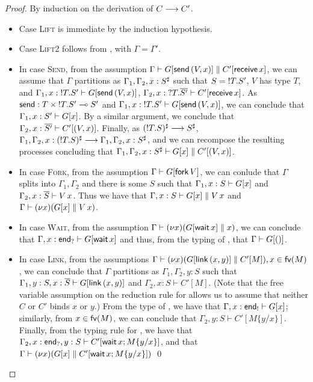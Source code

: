 \documentclass[orivec,envcountsame]{llncs}
\begin{document}
\begin{proof}
  By induction on the derivation of $C \longrightarrow C'$.
  \begin{itemize}
  \item Case \textsc{Lift} is immediate by the induction hypothesis.
  \item Case \textsc{Lift2} follows from , with $\Gamma = \Gamma'$.
  \item In case \textsc{Send}, from the assumption $\Gamma \vdash G[\mathsf{send}\,(V,x)] \parallel
    C'[\mathsf{receive} \, x]$, we can assume that $\Gamma$ partitions as
    $\Gamma_1,\Gamma_2,x:S^\sharp$ such that $S = {!T.S'}$, $V$ has type $T$, and
    $\Gamma_1,x:{!T.S'} \vdash G[\mathsf{send} \, (V,x)]$,
    $\Gamma_2,x:{?T.\overline{S'}} \vdash C'[\mathsf{receive} \, x]$.  As $\mathsf{send} : T
    \times {!T.S'} \multimap S'$ and $\Gamma_1,x:{!T.S'} \vdash G[\mathsf{send} \,
    (V,x)]$, we can conclude that $\Gamma_1,x:S' \vdash G[x]$.  By a similar argument, we conclude
    that $\Gamma_2,x:\overline{S'} \vdash C'[(V,x)]$. Finally, as $({!T.S})^\sharp \longrightarrow
    S^\sharp$, $\Gamma_1,\Gamma_2,x:({!T.S})^\sharp \longrightarrow
    \Gamma_1,\Gamma_2,x:S^\sharp$, and we can recompose the resulting processes concluding that
    $\Gamma_1,\Gamma_2,x:S^\sharp \vdash G[x] \parallel C'[(V,x)]$.
  \item In case \textsc{Fork}, from the assumption $\Gamma \vdash G[\mathsf{fork} \, V]$, we can
    conlude that $\Gamma$ splits into $\Gamma_1,\Gamma_2$ and there is some $S$ such that
    $\Gamma_1,x:S \vdash G[x]$ and $\Gamma_2,x:\overline{S} \vdash V \, x$.  Thus we have that
    $\Gamma,x:S \vdash G[x] \parallel V \, x$ and $\Gamma \vdash (\nu x)(G[x] \parallel
    V \, x)$.
  \item In case \textsc{Wait}, from the assumption $\Gamma \vdash (\nu x)(G[\mathsf{wait} \,
    x] \parallel x)$, we can conclude that $\Gamma,x:\mathsf{end}_? \vdash G[\mathsf{wait} \, x]$ and
    thus, from the typing of , that $\Gamma \vdash G[()]$.
  \item In case \textsc{Link}, from the assumptions $\Gamma \vdash (\nu x) (G[\mathsf{link} \,
    (x, y)] \parallel C'[M]), x \in \mathsf{fv}(M)$, we can conclude that $\Gamma$ partitions as
    $\Gamma_1,\Gamma_2,y:S$ such that $\Gamma_1,y:S,x:\overline{S} \vdash G[\mathsf{link} \, (x,
    y)]$ and $\Gamma_2,x:S \vdash C'[M]$.  (Note that the free variable assumption on the reduction
    rule for  allows us to assume that neither $C$ or $C'$ binds $x$ or $y$.)  From
    the type of , we have that $\Gamma,x:\mathsf{end}_! \vdash G[x]$; similarly, from $x \in
    \mathsf{fv}(M)$, we can conclude that $\Gamma_2,y:S \vdash C'[M\{y/x\}]$.  Finally, from the typing rule
    for , we have that $\Gamma_2,x:\mathsf{end}_?,y:S \vdash C'[\mathsf{wait}
      \, x; M\{y/x\}]$, and that $\Gamma \vdash (\nu x)(G[x] \parallel
    C'[\mathsf{wait} \, x; M\{y/x\}])$ \qed
  \end{itemize}
\end{proof}
\end{document}
